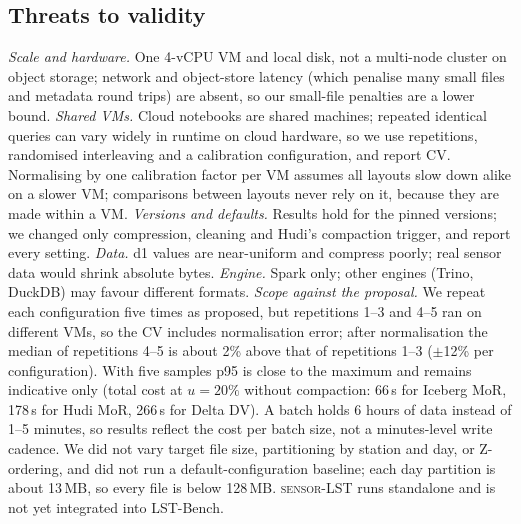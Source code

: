 \documentclass[conference]{IEEEtran}
\newcommand{\sys}{\textsc{sensor-LST}}
\begin{document}
\subsection{Threats to validity}
\emph{Scale and hardware.} One 4-vCPU VM and local disk, not a multi-node cluster on object storage; network and
object-store latency (which penalise many small files and metadata round trips) are absent, so our small-file
penalties are a lower bound. \emph{Shared VMs.} Cloud notebooks are shared machines; repeated identical queries can
vary widely in runtime on cloud hardware, so we use repetitions, randomised interleaving and a calibration
configuration, and report CV. Normalising by one calibration factor per VM assumes all layouts slow down alike on
a slower VM; comparisons between layouts never rely on it, because they are made within a VM. \emph{Versions and defaults.} Results hold for the pinned versions; we changed only
compression, cleaning and Hudi's compaction trigger, and report every setting. \emph{Data.} d1 values are
near-uniform and compress poorly; real sensor data would shrink absolute bytes. \emph{Engine.} Spark only; other
engines (Trino, DuckDB) may favour different formats. \emph{Scope against the proposal.} We repeat each configuration
five times as proposed, but repetitions 1--3 and 4--5 ran on different VMs, so the CV includes normalisation error; after normalisation the
median of repetitions 4--5 is about 2\% above that of repetitions 1--3 ($\pm$12\% per configuration). With five samples p95 is close to the
maximum and remains indicative only (total cost at $u=20\%$ without compaction: 66\,s for Iceberg MoR, 178\,s for Hudi MoR, 266\,s for Delta DV). A batch holds 6 hours of data instead of 1--5 minutes,
so results reflect the cost per batch size, not a minutes-level write cadence. We did not vary target file size,
partitioning by station and day, or Z-ordering, and did not run a default-configuration baseline; each day partition
is about 13\,MB, so every file is below 128\,MB. \sys{} runs standalone and is not yet integrated into LST-Bench.

\end{document}
